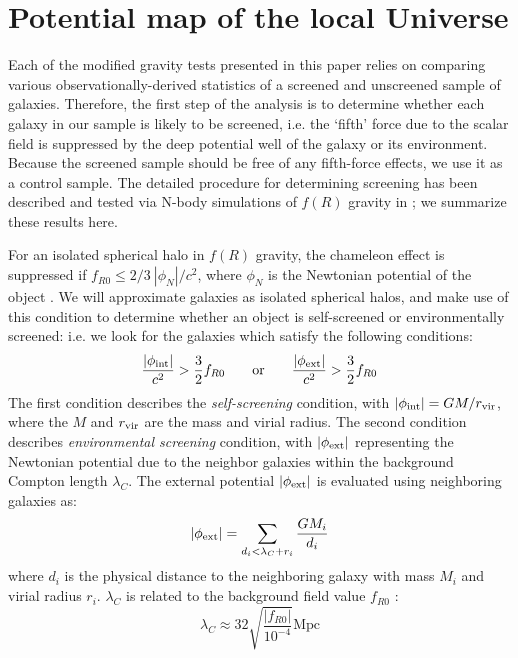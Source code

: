 \documentclass[useAMS,usenatbib,twocolumn]{mn2e}
\begin{document}
\section{Potential map of the local Universe}
\label{pot-sec}
Each of the modified gravity tests presented in this paper relies on comparing
various observationally-derived statistics of a screened and unscreened sample
of galaxies.
Therefore, the first step of the analysis is to determine whether each
galaxy in our sample is likely to be screened, i.e. the `fifth' force due
to the  scalar field is suppressed by the deep 
potential well of the galaxy or its environment.  
Because the screened sample should be free of any fifth-force effects, we use
it as a control sample.  The detailed procedure for 
determining screening has been described and tested via N-body simulations
of $f(R)$ gravity in \cite{cabre2012}; we summarize these results here.

For an isolated spherical halo in $f(R)$ gravity,
the chameleon effect is suppressed if $f_{R0} \leq 2/3\
|\phi_N|/c^2$, where $\phi_N$ is the Newtonian  potential of the object
\citep{hu07}. We will approximate galaxies as isolated spherical halos,
and make use of this condition to determine whether an
object is self-screened or environmentally screened: i.e. we look for the
galaxies which satisfy the following conditions: 
\begin{equation}
\label{eq:criterion} 
 \frac{|\phi_{\rm int}|}{c^2}>\frac{3}{2} f_{R0}\; \; \; \; \; \; \; \mathrm{or}
\; \; \; \; \; \; \; \frac{|\phi_{\rm ext}|}{c^2}>\frac{3}{2} f_{R0}
\end{equation}
The first condition describes the {\it self-screening} condition, with 
$ |\phi_{\rm int}|= GM/r_{\rm vir}$, where the $M$ and $r_{\rm vir}$ are the
mass and virial radius. The second condition describes {\it environmental
screening} condition, with $|\phi_{\rm ext}|$ representing the
Newtonian potential due to the neighbor galaxies within the background Compton
length $\lambda_C$.
The external potential $|\phi_{\rm ext}|$ is evaluated using 
neighboring galaxies as:
\begin{equation}\label{eq:criterion22} 
 |\phi_{\rm ext}|= \sum_{d_i<\lambda_C+r_i} \frac{GM_i}{d_i}
\end{equation}
where $d_i$ is the physical distance to the neighboring
galaxy with mass $M_i$ and virial radius $r_i$. $\lambda_C$ is related
to the background field value $f_{R0}$
\citep{sch09}:
\begin{equation}
 \lambda_C \approx 32 \sqrt{\frac{\left|f_{R0}\right|}{10^{-4}}} \mathrm{ Mpc}
 \label{eq:compton}
\end{equation}
\end{document}
